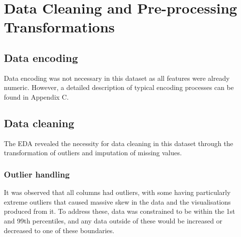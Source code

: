 \documentclass[12pt]{report}
\begin{document}
\section{Data Cleaning and Pre-processing Transformations}\label{sec:Preprocessing}


\subsection{Data encoding}
Data encoding was not necessary in this dataset as all features were already numeric. However, a detailed description of typical 
encoding processes can be found in Appendix C.

\subsection{Data cleaning}
The EDA revealed the necessity for data cleaning in this dataset through the transformation of outliers and imputation of missing values.

\subsubsection{Outlier handling}
It was observed that all columns had outliers, with some having particularly extreme outliers that caused massive skew in the data and 
the visualisations produced from it. To address these, data was constrained to be within the 1st and 99th percentiles, and any data outside 
of these would be increased or decreased to one of these boundaries.
\end{document}
